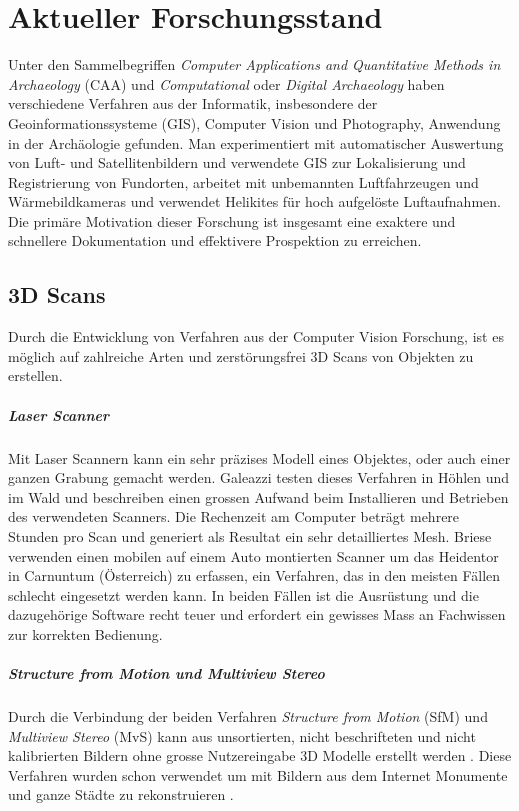 \chapter{Aktueller Forschungsstand} \label{related:work}

	Unter den Sammelbegriffen \emph{Computer Applications and Quantitative Methods in Archaeology} (CAA) und \emph{Computational} oder \emph{Digital Archaeology} haben verschiedene Verfahren aus der Informatik, insbesondere der Geoinformationssysteme (GIS), Computer Vision und Photography, Anwendung in der Archäologie gefunden.
	Man experimentiert mit automatischer Auswertung von Luft- und Satellitenbildern und verwendete GIS zur Lokalisierung und Registrierung von Fundorten, arbeitet mit unbemannten Luftfahrzeugen und Wärmebildkameras und verwendet Helikites für hoch aufgelöste Luftaufnahmen.
	Die primäre Motivation dieser Forschung ist insgesamt eine exaktere und schnellere Dokumentation und effektivere Prospektion zu erreichen.

	\section{3D Scans}
		Durch die Entwicklung von Verfahren aus der Computer Vision Forschung, ist es möglich auf zahlreiche Arten und zerstörungsfrei 3D Scans von Objekten zu erstellen.
		\paragraph{Laser Scanner}
			Mit Laser Scannern kann ein sehr präzises Modell eines Objektes, oder auch einer ganzen Grabung gemacht werden. Galeazzi  \etal{} testen dieses Verfahren in Höhlen und im Wald und beschreiben einen grossen Aufwand beim Installieren und Betrieben des verwendeten Scanners. Die Rechenzeit am Computer beträgt mehrere Stunden pro Scan und generiert als Resultat ein sehr detailliertes Mesh.
			Briese \etal{} verwenden einen mobilen auf einem Auto montierten Scanner um das Heidentor in Carnuntum (Österreich) zu erfassen, ein Verfahren, das in den meisten Fällen schlecht eingesetzt werden kann.
			In beiden Fällen ist die Ausrüstung und die dazugehörige Software recht teuer und erfordert ein gewisses Mass an Fachwissen zur korrekten Bedienung.

		\paragraph{Structure from Motion und Multiview Stereo}
			Durch die Verbindung der beiden Verfahren \emph{Structure from Motion} (SfM) und \emph{Multiview Stereo} (MvS) kann aus unsortierten, nicht beschrifteten und nicht kalibrierten Bildern ohne grosse Nutzereingabe 3D Modelle erstellt werden . Diese Verfahren wurden schon verwendet um mit Bildern aus dem Internet Monumente und ganze Städte zu rekonstruieren .
		
